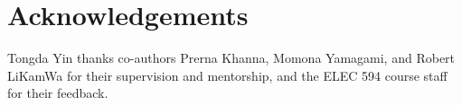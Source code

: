 \section*{Acknowledgements}
Tongda Yin thanks co-authors Prerna Khanna, Momona Yamagami, and Robert LiKamWa
for their supervision and mentorship, and the ELEC 594
course staff for their feedback.
